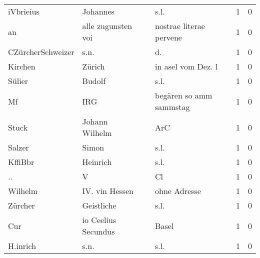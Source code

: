 \documentclass[10pt,a4paper,landscape]{article}
\begin{document}
\begin{longtable}{llllrr}
                iVbrieius &                           Johannes &             &                                        s.l. &          1 &         0 \\
                       an &                 alle zugunsten voi &             &                     nostrae literae pervene &          1 &         0 \\
        CZürcherSchweizer &                               s.n. &             &                                         d.  &          1 &         0 \\
                  Kirchen &                             Zürich &             &                          in asel vom Dez. l &          1 &         0 \\
                   Sülier &                             Budolf &             &                                        s.l. &          1 &         0 \\
                       Mf &                                IRG &             &                     begären so amm sammstag &          1 &         0 \\
                    Stuck &                     Johann Wilhelm &             &                                         ArC &          1 &         0 \\
                   Salzer &                              Simon &             &                                        s.l. &          1 &         0 \\
                  KffiBbr &                           Heinrich &             &                                        s.l. &          1 &         0 \\
                       .. &                                  V &             &                                          Cl &          1 &         0 \\
                  Wilhelm &                     IV. vin Hessen &             &                                ohne Adresse &          1 &         0 \\
                  Zürcher &                         Geistliche &             &                                        s.l. &          1 &         0 \\
                      Cur &                io Ceelius Secundus &             &                                       Basel &          1 &         0 \\
                 H.inrich &                               s.n. &             &                                        s.l. &          1 &         0 \\

\end{longtable}
\end{document}
